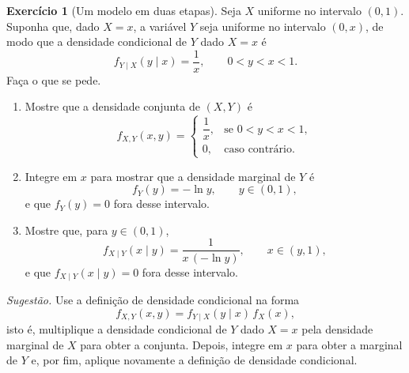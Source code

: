 \documentclass[12pt,portuguese]{article}
\theoremstyle{definition}
\theoremstyle{plainexercise}
\newtheorem{exercise}{Exercício}
\theoremstyle{starredexercise}
\theoremstyle{definition}
\begin{document}
\begin{exercise}[Um modelo em duas etapas]\label{exercise:modelo-duas-etapas}
Seja $X$ uniforme no intervalo $(0,1)$. Suponha que, dado $X = x$, a variável $Y$ seja
uniforme no intervalo $(0,x)$, de modo que a densidade condicional de $Y$ dado $X = x$ é
\[
  f_{Y\mid X}(y \mid x) = \frac{1}{x}, \qquad 0 < y < x < 1.
\]
Faça o que se pede.

\begin{enumerate}
  \item[(a)] Mostre que a densidade conjunta de $(X,Y)$ é
  \begin{equation}\label{eq:conjunta-hierarquico}
    f_{X,Y}(x,y) =
    \begin{cases}
      \dfrac{1}{x}, & \text{se } 0 < y < x < 1, \\[0.5cm]
      0, & \text{caso contrário}.
    \end{cases}
  \end{equation}

  \item[(b)] Integre em $x$ para mostrar que a densidade marginal de $Y$ é
  \begin{equation}\label{eq:marginal-y-hierarquico}
    f_Y(y) = -\ln y, \qquad y \in (0,1),
  \end{equation}
  e que $f_Y(y) = 0$ fora desse intervalo.

  \item[(c)] Mostre que, para $y \in (0,1)$,
  \begin{equation}\label{eq:condicional-hierarquico}
    f_{X\mid Y}(x \mid y) = \frac{1}{x\,(-\ln y)}, \qquad x \in (y,1),
  \end{equation}
  e que $f_{X\mid Y}(x \mid y) = 0$ fora desse intervalo.
\end{enumerate}

\noindent\emph{Sugestão.} Use a definição de densidade condicional na forma
\[
  f_{X,Y}(x,y) = f_{Y\mid X}(y \mid x)\, f_X(x),
\]
isto é, multiplique a densidade condicional
de $Y$ dado $X = x$ pela densidade marginal de $X$ para obter a conjunta. Depois, integre em
$x$ para obter a marginal de $Y$ e, por fim, aplique novamente a definição de densidade
condicional.
\end{exercise}




\end{document}
